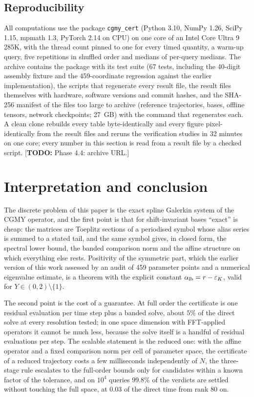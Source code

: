 \documentclass[hidelinks]{siamart251216}
\newcommand{\rf}{r}
\newcommand{\todo}[1]{\textcolor{red!70!black}{[\textbf{TODO:} #1]}}
\begin{document}
\subsection{Reproducibility}
\label{ssec:archive}
All computations use the package \texttt{cgmy\_cert} (Python 3.10, NumPy 1.26, SciPy 1.15, mpmath
1.3, PyTorch 2.14 on CPU) on one core of an Intel Core Ultra 9 285K, with the thread count pinned to
one for every timed quantity, a warm-up query, five repetitions in shuffled order and medians of
per-query medians.  The archive contains the package with its test suite (67 tests, including the
40-digit assembly fixture and the 459-coordinate regression against the earlier implementation),
the scripts that regenerate every result file, the result files themselves with hardware, software
versions and commit hashes, and the SHA-256 manifest of the files too large to archive (reference
trajectories, bases, offline tensors, network checkpoints; 27~GB) with the command that regenerates
each.  A clean clone rebuilds every table byte-identically and every figure pixel-identically from
the result files and reruns the verification studies in 32 minutes on one core; every number in
this section is read from a result file by a checked script.
\todo{Phase 4.4: archive URL.}
\FloatBarrier

\section{Interpretation and conclusion}
\label{sec:conclusion}\label{sec:discussion}
The discrete problem of this paper is the exact spline Galerkin system of the CGMY operator, and
the first point is that for shift-invariant bases ``exact'' is cheap: the matrices are Toeplitz
sections of a periodised symbol whose alias series is summed to a stated tail, and the same symbol
gives, in closed form, the spectral lower bound, the banded comparison norm and the affine
structure on which everything else rests.  Positivity of the symmetric part, which the earlier
version of this work assessed by an audit of 459 parameter points and a numerical eigenvalue
estimate, is a theorem with the explicit constant $\alpha_{\rm lb}=\rf-\varepsilon_K$, valid for
$Y\in(0,2)\setminus\{1\}$.

The second point is the cost of a guarantee.  At full order the certificate is one residual
evaluation per time step plus a banded solve, about $5\%$ of the direct solve at every resolution
tested; in one space dimension with FFT-applied operators it cannot be much less, because the
solve itself is a handful of residual evaluations per step.  The scalable statement is the reduced
one: with the affine operator and a fixed comparison norm per cell of parameter space, the
certificate of a reduced trajectory costs a few milliseconds independently of $N$, the three-stage
rule escalates to the full-order bounds only for candidates within a known factor of the
tolerance, and on $10^4$ queries $99.8\%$ of the verdicts are settled without touching the full
space, at $0.03$ of the direct time from rank $80$ on.
\end{document}
